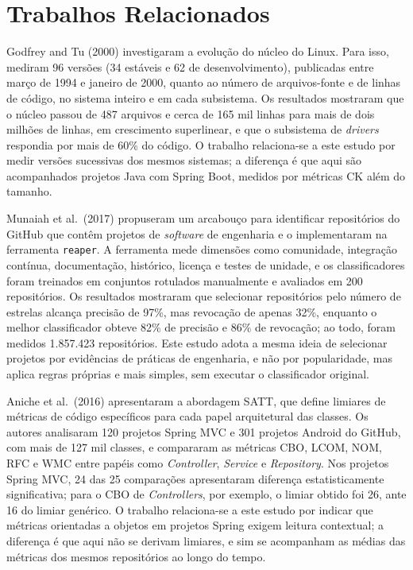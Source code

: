 \section{Trabalhos Relacionados}
\label{sec:trabalhos}

Godfrey and Tu (2000)\nocite{godfrey:00} investigaram a evolução do núcleo do Linux. Para isso, mediram 96 versões (34 estáveis e 62 de desenvolvimento), publicadas entre março de 1994 e janeiro de 2000, quanto ao número de arquivos-fonte e de linhas de código, no sistema inteiro e em cada subsistema. Os resultados mostraram que o núcleo passou de 487 arquivos e cerca de 165 mil linhas para mais de dois milhões de linhas, em crescimento superlinear, e que o subsistema de \emph{drivers} respondia por mais de 60\% do código. O trabalho relaciona-se a este estudo por medir versões sucessivas dos mesmos sistemas; a diferença é que aqui são acompanhados projetos Java com Spring Boot, medidos por métricas CK além do tamanho.

Munaiah et al.\ (2017)\nocite{munaiah:17} propuseram um arcabouço para identificar repositórios do GitHub que contêm projetos de \emph{software} de engenharia e o implementaram na ferramenta \texttt{reaper}. A ferramenta mede dimensões como comunidade, integração contínua, documentação, histórico, licença e testes de unidade, e os classificadores foram treinados em conjuntos rotulados manualmente e avaliados em 200 repositórios. Os resultados mostraram que selecionar repositórios pelo número de estrelas alcança precisão de 97\%, mas revocação de apenas 32\%, enquanto o melhor classificador obteve 82\% de precisão e 86\% de revocação; ao todo, foram medidos 1.857.423 repositórios. Este estudo adota a mesma ideia de selecionar projetos por evidências de práticas de engenharia, e não por popularidade, mas aplica regras próprias e mais simples, sem executar o classificador original.

Aniche et al.\ (2016)\nocite{aniche:16} apresentaram a abordagem SATT, que define limiares de métricas de código específicos para cada papel arquitetural das classes. Os autores analisaram 120 projetos Spring MVC e 301 projetos Android do GitHub, com mais de 127 mil classes, e compararam as métricas CBO, LCOM, NOM, RFC e WMC entre papéis como \emph{Controller}, \emph{Service} e \emph{Repository}. Nos projetos Spring MVC, 24 das 25 comparações apresentaram diferença estatisticamente significativa; para o CBO de \emph{Controllers}, por exemplo, o limiar obtido foi 26, ante 16 do limiar genérico. O trabalho relaciona-se a este estudo por indicar que métricas orientadas a objetos em projetos Spring exigem leitura contextual; a diferença é que aqui não se derivam limiares, e sim se acompanham as médias das métricas dos mesmos repositórios ao longo do tempo.


